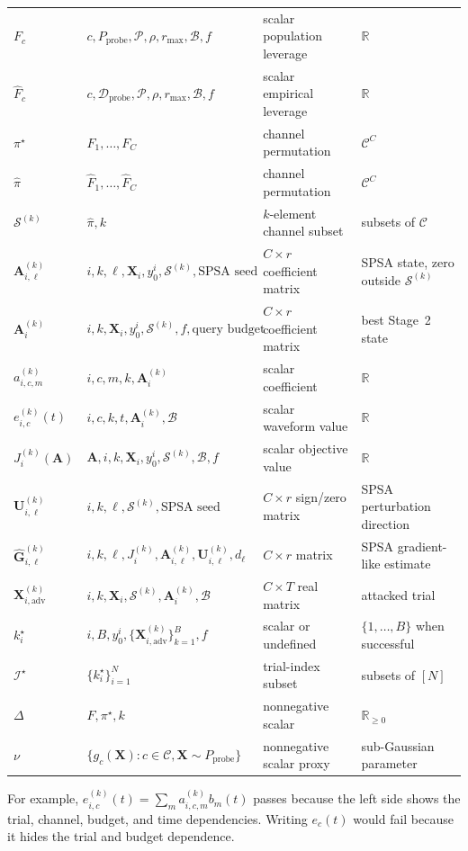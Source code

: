 \documentclass[11pt]{article}
\begin{document}
\begin{longtable}{@{}>{\raggedright\arraybackslash}p{}
>{\raggedright\arraybackslash}p{}
>{\raggedright\arraybackslash}p{}
>{\raggedright\arraybackslash}p{}@{}}
$F_c$ & $c,P_{\mathrm{probe}},\mathcal{P},\rho,r_{\max},\mathcal{B},f$ & scalar population leverage & $\mathbb{R}$ \\
$\widehat F_c$ & $c,\mathcal{D}_{\mathrm{probe}},\mathcal{P},\rho,r_{\max},\mathcal{B},f$ & scalar empirical leverage & $\mathbb{R}$ \\
$\pi^\star$ & $F_1,\ldots,F_C$ & channel permutation & $\mathcal{C}^{C}$ \\
$\widehat\pi$ & $\widehat F_1,\ldots,\widehat F_C$ & channel permutation & $\mathcal{C}^{C}$ \\
$\mathcal{S}^{(k)}$ & $\widehat\pi,k$ & $k$-element channel subset & subsets of $\mathcal{C}$ \\
$\mathbf{A}_{i,\ell}^{(k)}$ & $i,k,\ell,\mathbf{X}_i,y_0^i,\mathcal{S}^{(k)},\text{SPSA seed}$ & $C\times r$ coefficient matrix & SPSA state, zero outside $\mathcal{S}^{(k)}$ \\
$\mathbf{A}_i^{(k)}$ & $i,k,\mathbf{X}_i,y_0^i,\mathcal{S}^{(k)},f,\text{query budget}$ & $C\times r$ coefficient matrix & best Stage~2 state \\
$a_{i,c,m}^{(k)}$ & $i,c,m,k,\mathbf{A}_i^{(k)}$ & scalar coefficient & $\mathbb{R}$ \\
$e_{i,c}^{(k)}(t)$ & $i,c,k,t,\mathbf{A}_i^{(k)},\mathcal{B}$ & scalar waveform value & $\mathbb{R}$ \\
$J_i^{(k)}(\mathbf{A})$ & $\mathbf{A},i,k,\mathbf{X}_i,y_0^i,\mathcal{S}^{(k)},\mathcal{B},f$ & scalar objective value & $\mathbb{R}$ \\
$\mathbf{U}_{i,\ell}^{(k)}$ & $i,k,\ell,\mathcal{S}^{(k)},\text{SPSA seed}$ & $C\times r$ sign/zero matrix & SPSA perturbation direction \\
$\widehat{\mathbf{G}}_{i,\ell}^{(k)}$ & $i,k,\ell,J_i^{(k)},\mathbf{A}_{i,\ell}^{(k)},\mathbf{U}_{i,\ell}^{(k)},d_\ell$ & $C\times r$ matrix & SPSA gradient-like estimate \\
$\mathbf{X}_{i,\mathrm{adv}}^{(k)}$ & $i,k,\mathbf{X}_i,\mathcal{S}^{(k)},\mathbf{A}_i^{(k)},\mathcal{B}$ & $C\times T$ real matrix & attacked trial \\
$k_i^\star$ & $i,B,y_0^i,\{\mathbf{X}_{i,\mathrm{adv}}^{(k)}\}_{k=1}^{B},f$ & scalar or undefined & $\{1,\ldots,B\}$ when successful \\
$\mathcal{I}^\star$ & $\{k_i^\star\}_{i=1}^{N}$ & trial-index subset & subsets of $[N]$ \\
$\Delta$ & $F,\pi^\star,k$ & nonnegative scalar & $\mathbb{R}_{\ge 0}$ \\
$\nu$ & $\{g_c(\mathbf{X}):c\in\mathcal{C},\mathbf{X}\sim P_{\mathrm{probe}}\}$ & nonnegative scalar proxy & sub-Gaussian parameter \\
\bottomrule
\end{longtable}
\endgroup
For example, $e_{i,c}^{(k)}(t)=\sum_m a_{i,c,m}^{(k)}b_m(t)$ passes because the left side
shows the trial, channel, budget, and time dependencies. Writing $e_c(t)$ would fail
because it hides the trial and budget dependence.
\end{document}
